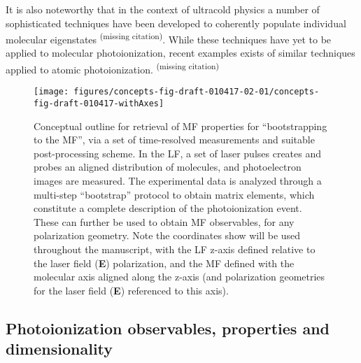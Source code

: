 \documentclass[10pt]{article}
\begin{document}
It is also noteworthy that in the context of ultracold physics a number of sophisticated techniques have been developed to coherently populate individual molecular eigenstates \textsuperscript{(missing citation)}. While these techniques have yet to be applied to molecular photoionization, recent examples exists of similar techniques applied to atomic photoionization. \textsuperscript{(missing citation)}

\begin{figure}[H]
\begin{center}
\texttt{[image: figures/concepts-fig-draft-010417-02-01/concepts-fig-draft-010417-withAxes]}
\caption{{Conceptual outline for retrieval of MF properties for ``bootstrapping to
the MF'', via a set of time-resolved measurements and suitable
post-processing scheme. In the LF, a set of laser pulses creates and
probes an aligned distribution of molecules, and photoelectron images
are measured. The experimental data is analyzed through a multi-step
``bootstrap'' protocol to obtain matrix elements, which constitute a
complete description of the photoionization event. These can further be
used to obtain MF observables, for any polarization geometry. Note the
coordinates show will be used throughout the manuscript, with the LF
z-axis defined relative to the laser field (\textbf{E}) polarization,
and the MF defined with the molecular axis aligned along the z-axis (and
polarization geometries for the laser field (\textbf{E}) referenced to
this axis).~
{\label{781808}}%
}}
\end{center}
\end{figure}



\subsection{Photoionization observables, properties and dimensionality\label{sec:Photo-into}}
\end{document}
